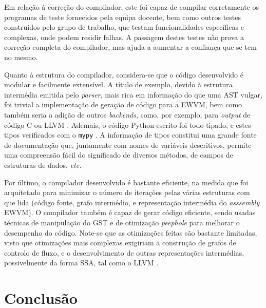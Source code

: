 \documentclass[12pt, a4paper]{article}
\begin{document}
Em relação à correção do compilador, este foi capaz de compilar corretamente os programas de teste
fornecidos pela equipa docente, bem como outros testes construídos pelo grupo de trabalho, que
testam funcionalidades específicas e complexas, onde podem residir falhas. A passagem destes testes
não prova a correção completa do compilador, mas ajuda a aumentar a confiança que se tem no mesmo.

Quanto à estrutura do compilador, considera-se que o código desenvolvido é modular e facilmente
extensível. A título de exemplo, devido à estrutura intermédia emitida pelo \emph{parser}, mais rica
em informação do que uma AST vulgar, foi trivial a implementação de geração de código para a EWVM,
bem como também seria a adição de outros \emph{backends}, como, por exemplo, para \emph{output} de
código C \cite{c} ou LLVM \cite{llvm}. Ademais, o código Python escrito foi todo tipado, e estes
tipos verificados com o \texttt{mypy} \cite{mypy}. A informação de tipos constitui uma grande fonte
de documentação que, juntamente com nomes de variáveis descritivos, permite uma compreensão fácil
do significado de diversos métodos, de campos de estruturas de dados, \emph{etc.}

Por último, o compilador desenvolvido é bastante eficiente, na medida que foi arquitetado para
minimizar o número de iterações pelas várias estruturas com que lida (código fonte, grafo
intermédio, e representação intermédia do \emph{asssembly} EWVM). O compilador também é capaz de
gerar código eficiente, sendo usadas técnicas de manipulação do GST e de otimização \emph{peephole}
para melhorar o desempenho do código. Note-se que as otimizações feitas são bastante limitadas,
visto que otimizações mais complexas exigiriam a construção de grafos de controlo de fluxo, e o
desenvolvimento de outras representações intermédias, possivelmente da forma SSA, tal como o LLVM
\cite{llvm}.

\section{Conclusão}
\end{document}
